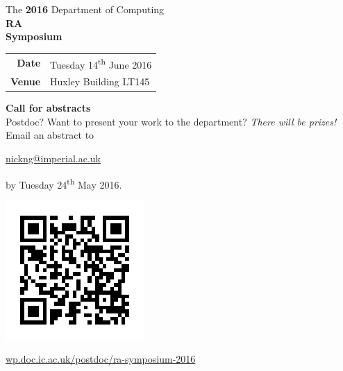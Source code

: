 \documentclass[a3,portrait]{a0poster}
\begin{document}
\begin{tcolorbox}[colback=iclightblue,colframe=iclightblue,width=\textwidth,sharp corners]
  \vskip 3cm
\noindent
{\fontsize{1.8cm}{2cm}\selectfont \color{gray}The \textbf{2016} Department of Computing}\\[3mm]
\noindent
{\fontsize{5cm}{6cm}\selectfont \color{icdarkblue} \textbf{RA}}\\
{\fontsize{5cm}{6cm}\selectfont \color{icdarkblue} \textbf{Symposium}}\\[3cm]
\end{tcolorbox}
\begin{center}
  \LARGE
  \begin{tabular}{rl}
  \textbf{Date} & Tuesday 14\textsuperscript{th} June 2016\\
  \textbf{Venue}& Huxley Building LT145\\
  \end{tabular}
\end{center}
\begin{tcolorbox}[colback=iclightblue,colframe=iclightblue,width=\textwidth,sharp corners]
  \vskip 3cm
\Large\textbf{\color{icmiddlered}Call for abstracts}\\
Postdoc? Want to present your work to the department? \textit{There will be prizes!} Email an abstract to
\vspace{1.5cm}
\begin{center}
\url{nickng@imperial.ac.uk}
\end{center}
\begin{center}
by Tuesday 24\textsuperscript{th} May 2016.
\end{center}
\vspace{1.5cm}
\end{tcolorbox}
\vfill
\noindent
\begin{minipage}{0.18\linewidth}
  \includegraphics{qr.png}
\end{minipage}
\begin{minipage}{0.8\linewidth}
\large
\quad
\href{http://wp.doc.ic.ac.uk/postdoc/ra-symposium-2016}
     {wp.doc.ic.ac.uk/postdoc/ra-symposium-2016}
\end{minipage}
\end{document}

